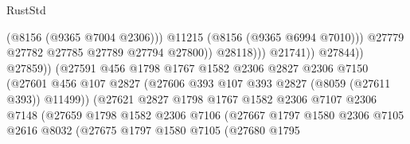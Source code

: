 \begin{lexlean}{RustStd}
\begin{coremodule}
{\begin{coremodule}
{{{{{{{{{{{{{{{{{{{{{{{{{{{{{{{{{{                                                          (@8156 (@9365 @7004 @2306)))
                                                        @11215
                                                        (@8156 (@9365 @6994 @7010)))
                                                      @27779
                                                      @27782
                                                      @27785
                                                      @27789
                                                      @27794
                                                      @27800))
                                                  @28118)))
                                            @21741))
                                        @27844))
                                    @27859))
                                (@27591
                                  @456
                                  @1798
                                  @1767
                                  @1582
                                  @2306
                                  @2827
                                  @2306
                                  @7150
                                  (@27601
                                    @456
                                    @107
                                    @2827
                                    (@27606 @393 @107 @393 @2827 (@8059 (@27611 @393)) @11499))
                                  (@27621
                                    @2827
                                    @1798
                                    @1767
                                    @1582
                                    @2306
                                    @7107
                                    @2306
                                    @7148
                                    (@27659
                                      @1798
                                      @1582
                                      @2306
                                      @7106
                                      (@27667
                                        @1797
                                        @1580
                                        @2306
                                        @7105
                                        @2616
                                        @8032
                                        (@27675
                                          @1797
                                          @1580
                                          @7105
                                          (@27680
                                            @1795
}}}}}}}}}}}}}}}}}}}}}}}}}}}}}}}}}}
\end{coremodule}}
\end{coremodule}
\end{lexlean}
